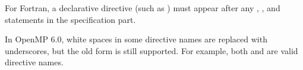 For Fortran, a declarative directive (such as )
must appear after any , , and  statements
in the specification part.

In OpenMP 6.0, white spaces in some directive names are replaced with
underscores, but the old form is still supported.  For example, 
both  and 
are valid directive names.








